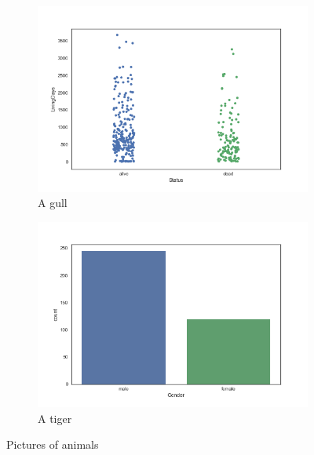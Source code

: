 \documentclass[a4paper,10pt]{article}
\begin{document}
\begin{figure}[ht]
    \centering
    \begin{subfigure}[b]{0.45\textwidth}
        \includegraphics[width=\textwidth]{livingstatusandstatus.png}
        \caption{A gull}
        \label{fig:gull}
    \end{subfigure}
     \begin{subfigure}[b]{0.45\textwidth}
       	 \includegraphics[width=\textwidth]{GenderVSstatus.png}
          \caption{A tiger}
          \label{fig:tiger}
    \end{subfigure}
    \caption{Pictures of animals}\label{fig:animals}
\end{figure}
  

 

 
 \subsection {}
\subsection {}





\end{document}
